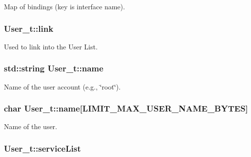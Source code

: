 Map of bindings (key is interface name). 

\subsubsection[{\texorpdfstring{link}{link}}]{ User\+\_\+t\+::link}\hypertarget{struct_user__t_a8a9876bfe48c8f39c527fbb1e0faa57f}{}\label{struct_user__t_a8a9876bfe48c8f39c527fbb1e0faa57f}


Used to link into the User List. 

\subsubsection[{\texorpdfstring{name}{name}}]{\setlength{\rightskip}{0pt plus 5cm}std\+::string User\+\_\+t\+::name}\hypertarget{struct_user__t_ae47d1ff0d855f07b3d28953e291ada70}{}\label{struct_user__t_ae47d1ff0d855f07b3d28953e291ada70}


Name of the user account (e.\+g., \char`\"{}root\char`\"{}). 

\subsubsection[{\texorpdfstring{name}{name}}]{\setlength{\rightskip}{0pt plus 5cm}char User\+\_\+t\+::name\mbox{[}{\bf L\+I\+M\+I\+T\+\_\+\+M\+A\+X\+\_\+\+U\+S\+E\+R\+\_\+\+N\+A\+M\+E\+\_\+\+B\+Y\+T\+ES}\mbox{]}}\hypertarget{struct_user__t_afde94960ea9b8f7a8ec21586fed6ec76}{}\label{struct_user__t_afde94960ea9b8f7a8ec21586fed6ec76}


Name of the user. 

\subsubsection[{\texorpdfstring{service\+List}{serviceList}}]{ User\+\_\+t\+::service\+List}\hypertarget{struct_user__t_a720e8b4b0f337ce5e546f581a46e29e4}{}\label{struct_user__t_a720e8b4b0f337ce5e546f581a46e29e4}


